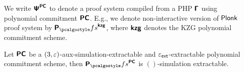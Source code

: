 \documentclass[runningheads,11pt]{llncs}
\begin{document}
We write $\bm{\mathsf{\Psi}}^{\bm{\mathsf{PC}}}$ to denote a proof system compiled from a PHP $\bm{\mathsf{\Gamma}}$ using
polynomial commitment $\bm{\mathsf{PC}}$. E.g., we denote non-interactive version of
$\textnormal{\textsf{Plonk}}$ proof system by $\plonkprotfs^{\kzg}$, where $\bm{\mathsf{kzg}}$ denotes the KZG
polynomial commitment scheme.

\begin{theorem}
  Let $\bm{\mathsf{PC}}$ be a $(3, \varepsilon)$-aux-simulation-extractable and
  $\varepsilon_{\mathsf{ext}}$-extractable  polynomial commitment scheme,
  then $\plonkprotfs^{\PCOM}$ is $()$-simulation extractable.
\end{theorem}
\end{document}
